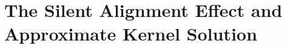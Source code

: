 \documentclass{article} %
\begin{document}
 


\section{The Silent Alignment Effect and Approximate Kernel Solution}\label{sec:silent_align_theory}
\end{document}
